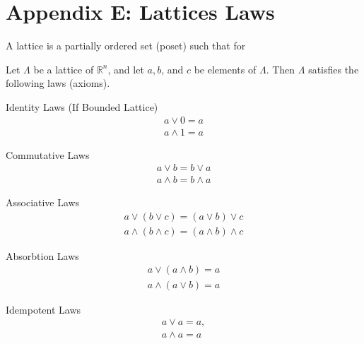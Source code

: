 \section{Appendix E: Lattices Laws}


A lattice is a partially ordered set (\gls{poset}) such that for


Let $\Lambda$ be a lattice of $\mathbb{R}^{n}$, and let $a,b$, and $c$ be elements of $\Lambda$. 
Then $\Lambda$ satisfies the following laws (axioms).


\begin{defn}{Identity Laws (If Bounded Lattice)}
    \begin{align*} 
    a\lor 0=a \\
    a\land 1=a
    \end{align*}
\end{defn}



\begin{defn}{Commutative Laws}
    \begin{align*} 
    a\lor b=b\lor a \\
    a\land b=b\land a
    \end{align*}
\end{defn}


\begin{defn}{Associative Laws}
    \begin{align*} 
    a\lor (b\lor c)=(a\lor b)\lor c \\
    a\land (b\land c)=(a\land b)\land c
    \end{align*}
\end{defn}



\begin{defn}{Absorbtion Laws}
    \begin{align*} 
    a\lor (a\land b)=a \\
    a\land (a\lor b)=a
    \end{align*}
\end{defn}



\begin{defn}{Idempotent Laws}
    \begin{align*} 
    a\lor a=a, \\
    a\land a=a 
    \end{align*}
\end{defn}